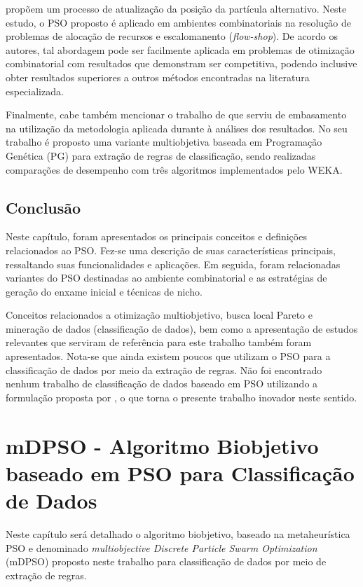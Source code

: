 \documentclass[
	12pt,				%
	openany,			%
	oneside,	
	a4paper,			%
	brazil,				%
	]{unimontes-ppgmsc-abntex2}
\begin{document}
 propõem um processo de atualização da posição da partícula alternativo. Neste estudo, o PSO proposto é aplicado em ambientes combinatoriais na resolução de problemas de alocação de recursos e escalomanento ({\em flow-shop}). De acordo os autores, tal abordagem pode ser facilmente aplicada em problemas de otimização combinatorial com resultados que demonstram ser competitiva, podendo inclusive obter resultados superiores a outros métodos encontradas na literatura especializada.

Finalmente, cabe também mencionar o trabalho de  que serviu de embasamento na utilização da metodologia aplicada durante à análises dos resultados. No seu trabalho é proposto uma variante multiobjetiva baseada em Programação Genética (PG) para extração de regras de classificação, sendo realizadas comparações de desempenho com três algoritmos implementados pelo WEKA.

\section{Conclusão}

Neste capítulo, foram apresentados os principais conceitos e definições relacionados ao PSO. Fez-se uma descrição de suas características principais, ressaltando suas funcionalidades e aplicações. Em seguida, foram relacionadas variantes do PSO destinadas ao ambiente combinatorial e as estratégias de geração do enxame inicial e técnicas de nicho.

Conceitos relacionados a otimização multiobjetivo, busca local Pareto e mineração de dados (classificação de dados), bem como a apresentação de estudos relevantes que serviram de referência para este trabalho também foram apresentados. Nota-se que ainda existem poucos que utilizam o PSO para a classificação de dados por meio da extração de regras. Não foi encontrado nenhum trabalho de classificação de dados baseado em PSO utilizando a formulação proposta por , o que torna o presente trabalho inovador neste sentido.


\chapter{mDPSO - Algoritmo Biobjetivo baseado em PSO para Classificação de Dados}
\label{ch:mdpso}

Neste capítulo será detalhado o algoritmo biobjetivo, baseado na metaheurística PSO e denominado {\em multiobjective Discrete Particle Swarm Optimization} (mDPSO) proposto neste trabalho para classificação de dados por meio de extração de regras. 
\end{document}
